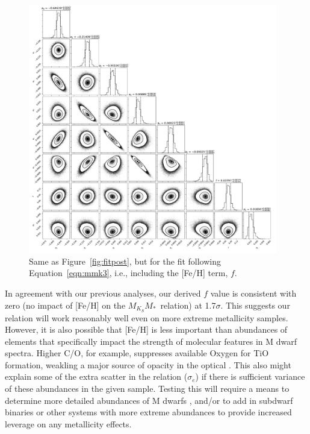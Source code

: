 \documentclass[twocolumn]{aastex62}
\newcommand{\mks}{$M_{K_S}$}
\newcommand{\mmk}{$M_{K_S}$\textendash$M_*$}
\begin{document}
\begin{figure}[p]
\begin{center}
\includegraphics[width=0.97\textwidth]{output_8feh_eMs.pdf}
\caption{Same as Figure~\ref{fig:fitpost}, but for the fit following Equation~\ref{eqn:mmk3}, i.e., including the [Fe/H] term, $f$. }
\label{fig:fitpost_feh}
\end{center}
\end{figure}


In agreement with our previous analyses, our derived $f$ value is consistent with zero (no impact of [Fe/H] on the \mmk\ relation) at 1.7$\sigma$. This suggests our relation will work reasonably well even on more extreme metallicity samples. However, it is also possible that [Fe/H] is less important than abundances of elements that specifically impact the strength of molecular features in M dwarf spectra. Higher C/O, for example, suppresses available Oxygen for TiO formation, weakling a major source of opacity in the optical \citep[e.g., C, O, Ti,][]{2012ApJ...747L..27F,2015ApJ...804...40G,Veyette2016a}. This also might explain some of the extra scatter in the relation ($\sigma_e$) if there is sufficient variance of these abundances in the given sample. Testing this will require a means to determine more detailed abundances of M dwarfs \citep[e.g.,][]{Veyette2017}, and/or to add in subdwarf binaries or other systems with more extreme abundances to provide increased leverage on any metallicity effects. 
\end{document}
